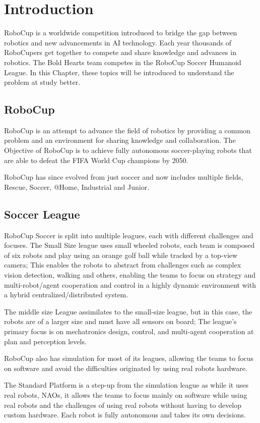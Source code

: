 \chapter{Introduction}
 RoboCup is a worldwide competition introduced to bridge the gap between robotics and new advancements in AI technology. Each year thousands of RoboCupers get together to compete and share knowledge and advances in robotics. The Bold Hearts team competes in the RoboCup Soccer Humanoid League. In this Chapter, these topics will be introduced to understand the problem at study better.

 \section{RoboCup}
 RoboCup is an attempt to advance the field of robotics by providing a common problem and an environment for sharing knowledge and collaboration.
 The Objective of RoboCup is to achieve fully autonomous soccer-playing robots that are able to defeat the FIFA World Cup champions by 2050. 

 RoboCup has since evolved from just soccer and now includes multiple fields, Rescue, Soccer, @Home, Industrial and Junior.
 \cite{RoboCup}

 \section{Soccer League}
 RoboCup Soccer is split into multiple leagues, each with different challenges and focuses. The Small Size league uses small wheeled robots, 
 each team is composed of six robots and play using an orange golf ball while tracked by a top-view camera;
 This enables the robots to abstract from challenges such as complex vision detection, 
 walking and others, enabling the teams to focus on strategy and multi-robot/agent cooperation and 
 control in a highly dynamic environment with a hybrid centralized/distributed system. 

 The middle size League assimilates to the small-size league, but in this case, the robots are of a larger size and must have all sensors on board; 
 The league's primary focus is on mechatronics design, control, and multi-agent cooperation at plan and perception levels.

 RoboCup also has simulation for most of its leagues, allowing the teams to focus on software and avoid the difficulties originated by using real robots hardware.

 The Standard Platform is a step-up from the simulation league as while it uses real robots, NAOs, it allows the teams to focus mainly on software while using real robots and the challenges of using real robots without having to develop custom hardware. Each robot is fully autonomous and takes its own decisions.

